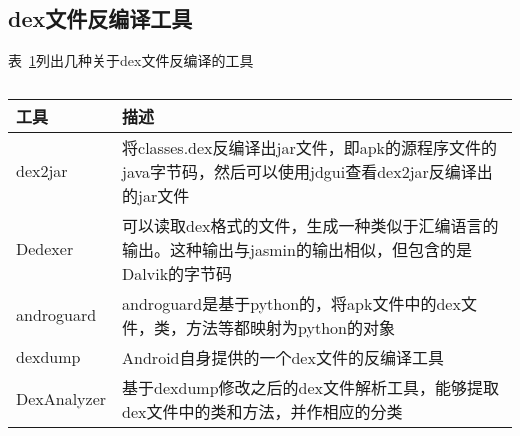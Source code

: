 \subsection{dex文件反编译工具}
\label{dextools}
表~\ref{fig:dextools}列出几种关于dex文件反编译的工具
\begin{table}[H]
\caption{\label{fig:dextools}}
\begin{tabular}{|p{2cm}|p{9.5cm}|}
\hline
工具 & 描述\\
\hline
dex2jar & 将classes.dex反编译出jar文件，即apk的源程序文件的java字节码，然后可以使用jdgui查看dex2jar反编译出的jar文件\\
\hline
Dedexer & 可以读取dex格式的文件，生成一种类似于汇编语言的输出。这种输出与jasmin的输出相似，但包含的是Dalvik的字节码\\
\hline
androguard & androguard是基于python的，将apk文件中的dex文件，类，方法等都映射为python的对象\\\hline
dexdump & Android自身提供的一个dex文件的反编译工具\\
\hline
DexAnalyzer & 基于dexdump修改之后的dex文件解析工具，能够提取dex文件中的类和方法，并作相应的分类\\
\hline
\end{tabular}
\end{table}

